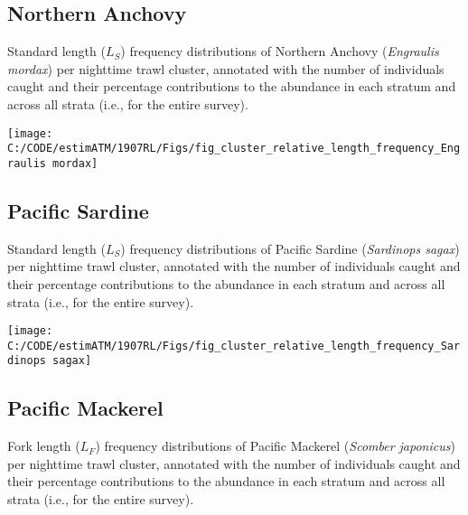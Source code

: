 \documentclass[]{article}
\begin{document}
\hypertarget{appendix-cluster-length-percent-anchovy}{%
\subsection{Northern Anchovy}\label{appendix-cluster-length-percent-anchovy}}

Standard length (\(L_S\)) frequency distributions of Northern Anchovy (\emph{Engraulis mordax}) per nighttime trawl cluster, annotated with the number of individuals caught and their percentage contributions to the abundance in each stratum and across all strata (i.e., for the entire survey).



\begin{center}\texttt{[image: C:/CODE/estimATM/1907RL/Figs/fig\_cluster\_relative\_length\_frequency\_Engraulis mordax]} \end{center}

\newpage

\hypertarget{appendix-cluster-length-percent-sardine}{%
\subsection{Pacific Sardine}\label{appendix-cluster-length-percent-sardine}}

Standard length (\(L_S\)) frequency distributions of Pacific Sardine (\emph{Sardinops sagax}) per nighttime trawl cluster, annotated with the number of individuals caught and their percentage contributions to the abundance in each stratum and across all strata (i.e., for the entire survey).



\begin{center}\texttt{[image: C:/CODE/estimATM/1907RL/Figs/fig\_cluster\_relative\_length\_frequency\_Sardinops sagax]} \end{center}

\newpage

\hypertarget{appendix-cluster-length-percent-mack}{%
\subsection{Pacific Mackerel}\label{appendix-cluster-length-percent-mack}}

Fork length (\(L_F\)) frequency distributions of Pacific Mackerel (\emph{Scomber japonicus}) per nighttime trawl cluster, annotated with the number of individuals caught and their percentage contributions to the abundance in each stratum and across all strata (i.e., for the entire survey).
\end{document}
